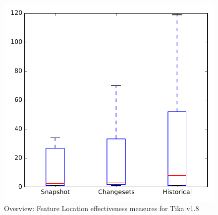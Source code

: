 
\begin{figure}
\centering
\includegraphics[height=0.4\textheight]{figures/flt/all_tika_no_outlier}
\caption{Overview: Feature Location effectiveness measures for Tika v1.8}
\label{fig:flt:all:tika}
\end{figure}

